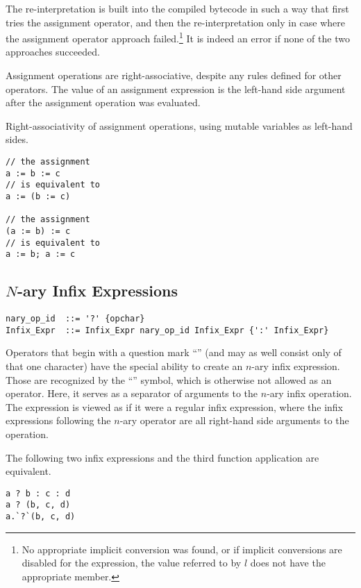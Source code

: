 The re-interpretation is built into the compiled bytecode in such a way that first tries the assignment operator, and then the re-interpretation only in case where the assignment operator approach failed.\footnote{No appropriate implicit conversion was found, or if implicit conversions are disabled for the expression, the value referred to by $l$ does not have the appropriate member.} It is indeed an error if none of the two approaches succeeded. 

Assignment operations are right-associative, despite any rules defined for other operators. The value of an assignment expression is the left-hand side argument after the assignment operation was evaluated. 

\example Right-associativity of assignment operations, using mutable variables as left-hand sides. 
\begin{lstlisting}
// the assignment
a := b := c
// is equivalent to
a := (b := c)

// the assignment
(a := b) := c
// is equivalent to 
a := b; a := c
\end{lstlisting}




\subsection{$N$-ary Infix Expressions}
\label{sec:nary-infix-expressions}

\syntax\begin{lstlisting}
nary_op_id  ::= '?' {opchar}
Infix_Expr  ::= Infix_Expr nary_op_id Infix_Expr {':' Infix_Expr}
\end{lstlisting}

Operators that begin with a question mark ``'' (and may as well consist only of that one character) have the special ability to create an $n$-ary infix expression. Those are recognized by the ``\code{:}'' symbol, which is otherwise not allowed as an operator. Here, it serves as a separator of arguments to the $n$-ary infix operation. The expression is viewed as if it were a regular infix expression, where the infix expressions following the $n$-ary operator are all right-hand side arguments to the operation. 

The following two infix expressions and the third function application are equivalent.
\begin{lstlisting}
a ? b : c : d
a ? (b, c, d)
a.`?`(b, c, d)
\end{lstlisting}

